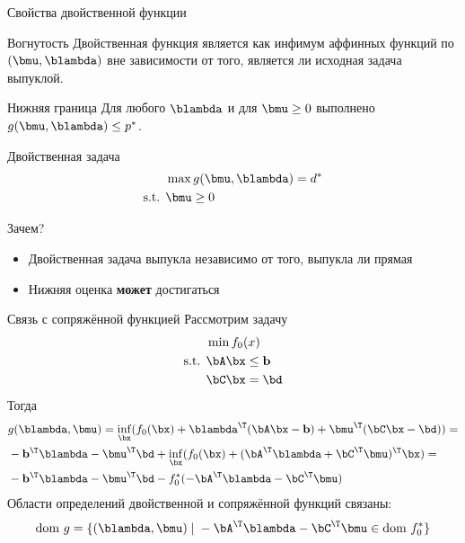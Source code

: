 \documentclass[12pt]{beamer}
\begin{document}
\begin{frame}{Свойства двойственной функции}
\small
\begin{block}{Вогнутость}
Двойственная функция является {\color{red}{вогнутой}} как инфимум аффинных функций по $(\bmu, \blambda)$ вне зависимости от того, является ли исходная задача выпуклой.
\end{block}

\begin{block}{Нижняя граница}
Для любого $\blambda$ и для $\bmu \geq 0$ выполнено $g(\bmu, \blambda) \leq p^*$.
\end{block}

\begin{block}{Двойственная задача}
\vspace{-5mm}
\begin{equation*}
\begin{split}
& \max g(\bmu, \blambda) = d^*\\
\text{s.t. } & \bmu \geq 0
\end{split}
\end{equation*}
\end{block}

\begin{block}{Зачем?}
\begin{itemize}
\vspace{-2mm}
\item Двойственная задача выпукла независимо от того, выпукла ли прямая
\vspace{-3mm}
\item Нижняя оценка \textbf{может} достигаться
\end{itemize}
\end{block}
\end{frame}

\begin{frame}{Связь с сопряжённой функцией}
Рассмотрим задачу
\begin{equation*}
\begin{split}
&\min f_0(x) \\
\text{s.t. } & \bA\bx \leq \mathbf{b}\\
& \bC\bx = \bd
\end{split}
\end{equation*}
Тогда
\begin{equation*}
\begin{split}
& g(\blambda, \bmu) = \inf_{\bx} (f_0(\bx) + \blambda^{\T}(\bA\bx - \mathbf{b}) + \bmu^{\T}(\bC\bx - \bd)) = \\
& - \mathbf{b}^{\T}\blambda - \bmu^{\T}\bd + \inf_{\bx}(f_0(\bx) + (\bA^{\T}\blambda + \bC^{\T}\bmu)^{\T}\bx) = \\
& - \mathbf{b}^{\T}\blambda - \bmu^{\T}\bd - f_0^*(-\bA^{\T}\blambda - \bC^{\T}\bmu)
\end{split}
\end{equation*}
Области определений двойственной и сопряжённой функций связаны:
\[
\text{dom } g = \{ (\blambda, \bmu) \; | \; -\bA^{\T}\blambda - \bC^{\T}\bmu \in \text{dom } f^*_0 \}
\] 
\end{frame}
\end{document}
